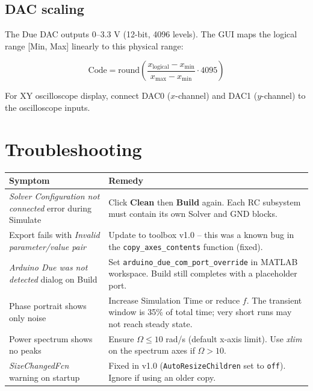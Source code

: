 \documentclass[12pt,a4paper]{article}
\begin{document}
\subsection{DAC scaling}

The Due DAC outputs 0--3.3 V (12-bit, 4096 levels).  The GUI maps the logical range [Min, Max] linearly to this physical range:

\begin{equation}
  \text{Code} = \text{round}\!\left(\frac{x_\text{logical} - x_\text{min}}{x_\text{max} - x_\text{min}}\cdot 4095\right)
\end{equation}

For XY oscilloscope display, connect DAC0 ($x$-channel) and DAC1 ($y$-channel) to the oscilloscope inputs.

\section{Troubleshooting}

\begin{center}
\begin{tabular}{p{5.5cm}p{8.5cm}}
\toprule
\textbf{Symptom} & \textbf{Remedy}\\
\midrule
\textit{Solver Configuration not connected} error during Simulate &
  Click \textbf{Clean} then \textbf{Build} again.  Each RC subsystem must contain its own Solver and GND blocks.\\
\midrule
Export fails with \textit{Invalid parameter/value pair} &
  Update to toolbox v1.0 -- this was a known bug in the \texttt{copy\_axes\_contents} function (fixed).\\
\midrule
\textit{Arduino Due was not detected} dialog on Build &
  Set \texttt{arduino\_due\_com\_port\_override} in MATLAB workspace.  Build still completes with a placeholder port.\\
\midrule
Phase portrait shows only noise &
  Increase Simulation Time or reduce $f$.  The transient window is 35\% of total time; very short runs may not reach steady state.\\
\midrule
Power spectrum shows no peaks &
  Ensure $\Omega \leq 10$ rad/s (default x-axis limit). Use \textit{xlim} on the spectrum axes if $\Omega > 10$.\\
\midrule
\textit{SizeChangedFcn} warning on startup &
  Fixed in v1.0 (\texttt{AutoResizeChildren} set to \texttt{off}).  Ignore if using an older copy.\\
\bottomrule
\end{tabular}
\end{center}
\end{document}
